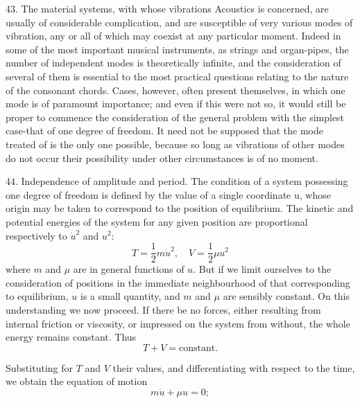 43. The material systems, with whose vibrations Acoustics is concerned, are
usually of considerable complication, and are susceptible of very various modes
of vibration, any or all of which may coexist at any particular moment. Indeed
in some of the most important musical instruments, as strings and organ-pipes,
the number of independent modes is theoretically infinite, and the
consideration of several of them is essential to the most practical questions
relating to the nature of the consonant chords. Cases, however, often present
themselves, in which one mode is of paramount importance; and even if this were
not so, it would still be proper to commence the consideration of the general
problem with the simplest case-that of one degree of freedom. It need not be
supposed that the mode treated of is the only one possible, because so long as
vibrations of other modes do not occur their possibility under other
circumstances is of no moment.

\setcounter{equation}{0}

44.  Independence of amplitude and period.
The condition of a system possessing one degree of freedom is defined by
the value of a single coordinate u, whose origin may be taken to correspond to
the position of equilibrium. The kinetic and potential energies of the system
for any given position are proportional respectively to
\(\dot{u}^2\)
and
\(u^2\):
\begin{equation}
T= \frac{1}{2} m \dot{u}^2, \quad V = \frac{1}{2} \mu u^2
\end{equation}
where \(m\) and \(\mu\) are in general functions of \(u\). But if we
limit ourselves to the consideration of positions in the immediate
neighbourhood of that corresponding to equilibrium,
\(u\) is a small quantity, and
\(m\) and \(\mu\)
are sensibly constant. On this understanding we now proceed. If there be
no forces, either resulting from internal friction or viscosity, or impressed
on the system from without, the whole energy remains constant. Thus
\[
T+V=\textrm{constant}.
\]

Substituting for
\(T\) and \(V\)
their values, and differentiating with respect to the
time, we obtain the equation of motion
\begin{equation}
m \ddot{u} + \mu u = 0;
\end{equation}

